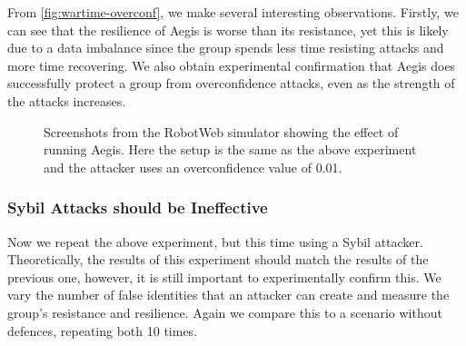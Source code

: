 From \autoref{fig:wartime-overconf}, we make several interesting observations. Firstly, we can see that the resilience of Aegis is worse than its resistance, yet this is likely due to a data imbalance since the group spends less time resisting attacks and more time recovering. We also obtain experimental confirmation that Aegis does successfully protect a group from overconfidence attacks, even as the strength of the attacks increases.

\begin{figure}[!h]
	\centering
	\caption{Screenshots from the RobotWeb simulator showing the effect of running Aegis. Here the setup is the same as the above experiment and the attacker uses an overconfidence value of 0.01.}
        \label{fig:wartime-overconf}
\end{figure}

\subsubsection{Sybil Attacks should be Ineffective}
Now we repeat the above experiment, but this time using a Sybil attacker. Theoretically, the results of this experiment should match the results of the previous one, however, it is still important to experimentally confirm this. We vary the number of false identities that an attacker can create and measure the group's resistance and resilience. Again we compare this to a scenario without defences, repeating both 10 times. 

